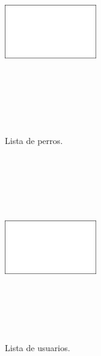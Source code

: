 \documentclass[a4paper, 12pt]{article}
\begin{document}
\begin{figure}[H]
   	\begin{minipage}{0.48\textwidth}
		\begin{center}
			{\includegraphics[height=8cm, width=4cm]{White.png}\par}
			\caption{Lista de perros.}
			\medskip
		\end{center}  
	\end{minipage}\hfill
   	\begin{minipage}{0.48\textwidth}
		\begin{center}
			{\includegraphics[height=8cm, width=4cm]{White.png}\par}
			\caption{Lista de usuarios.}
			\medskip
		\end{center}  
	\end{minipage}\hfill
\end{figure}
\end{document}
